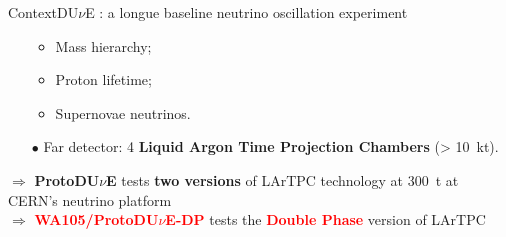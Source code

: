\documentclass[10pt]{beamer}
\begin{document}
\begin{frame}{Context}{DU$\nu$E : a longue baseline neutrino oscillation experiment}
\begin{scriptsize}
\begin{minipage}{0.38\textwidth}
\begin{itemize}
\begin{itemize}
	    				\item Mass hierarchy;
	    				\item Proton lifetime;
	    				\item Supernovae neutrinos.
	    			\end{itemize}
    			\item[$\bullet$] Far detector: 4 \textbf{Liquid Argon Time Projection Chambers} (> \SI{10}{\kilo\tonne}).
    		\end{itemize}
    		\vspace{.3cm}
    		$\Rightarrow$ \textbf{ProtoDU$\nu$E} tests \textbf{two versions} of LArTPC technology at \SI{300}{\tonne} at CERN's neutrino platform\\
    		
    		$\Rightarrow$ \textcolor{red}{\textbf{WA105/ProtoDU$\nu$E-DP}} tests the \textcolor{red}{\textbf{Double Phase}} version of LArTPC 
	    \end{minipage}
	\end{scriptsize}
    \end{frame}
    
    {
    	\setlength\pdfpagewidth{12.8cm}%
    	\setlength\pdfpageheight{9cm}%
    	\begin{frame}[plain]
    		
    	\end{frame}
    }
    
\end{document}
